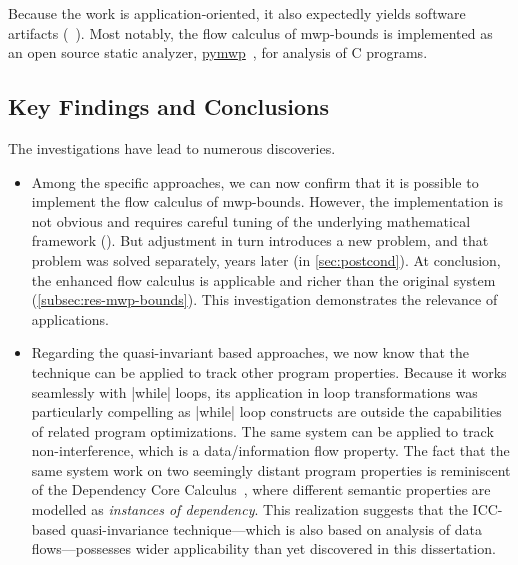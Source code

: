 
Because the work is application-oriented, it also expectedly yields software artifacts (\cf~).
Most notably, the flow calculus of mwp-bounds is implemented as an open source static analyzer,
\href{https://statycc.github.io/pymwp}{pymwp}~\cite{aubert2023b}, for analysis of C programs.

\subsection{Key Findings and Conclusions}
\label{subsec:results}

The investigations have lead to numerous discoveries.

\begin{itemize}

\item Among the specific approaches, we can now confirm that it is possible to implement the flow calculus of mwp-bounds.
However, the implementation is not obvious and requires careful tuning of the underlying mathematical framework ().
But adjustment in turn introduces a new problem, and that problem was solved separately, years later (in \autoref{sec:postcond}).
At conclusion, the enhanced flow calculus is applicable and richer than the original system (\cf\autoref{subsec:res-mwp-bounds}).
This investigation demonstrates the relevance of applications.

\item Regarding the quasi-invariant based approaches, we now know that the technique can be applied to track other program properties.
Because it works seamlessly with \pr|while| loops, its application in loop transformations was particularly compelling as
\pr|while| loop constructs are outside the capabilities of related program optimizations.
The same system can be applied to track non-interference, which is a data/information flow property.
The fact that the same system work on two seemingly distant program properties is reminiscent of the Dependency Core Calculus~\cite{abadi1999b},
where different semantic properties are modelled as \emph{instances of dependency}.
This realization suggests that the ICC-based quasi-invariance technique---which is also based on analysis of data flows---possesses wider applicability than yet discovered in this dissertation.

\end{itemize}


